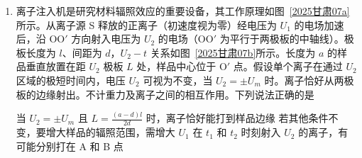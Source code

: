\documentclass[\gkver]{gaokaozhenti}
\begin{document}
\begin{enumerate}
{B．当 $t = \frac{T}{8}$ 与 $\frac{3T}{8}$ 时，因 $B-t$ 图像的斜率大小相等，符号相反，可知感应电动势 $E$ 大小相等，方向相反，选项 B 错误；

C．$t = \frac{T}{4}$ 时，$B$ 最大，则磁通量 $\Phi$ 最大，但是 $B$ 的变化率为零，则感应电动势 $E$ 为零，选项 C 正确；

D．$t = \frac{T}{2}$ 时，$B$ 为零，则磁通量 $\Phi$ 为零，但是 $B$ 的变化率最大，则感应电动势 $E$ 最大，选项 D 错误。

故选 C。
}

\item
离子注入机是研究材料辐照效应的重要设备，其工作原理如图~\ref{2025甘肃07a}所示。从离子源 S 释放的正离子（初速度视为零）经电压为 $U_{1}$ 的电场加速后，沿 OO$'$ 方向射入电压为 $U_{2}$ 的电场（OO$'$ 为平行于两极板的中轴线）。极板长度为 $l$、间距为 $d$，$U_{2}-t$ 关系如图~\ref{2025甘肃07b}所示。长度为 $a$ 的样品垂直放置在距 $U_{2}$ 极板 $L$ 处，样品中心位于 O$'$ 点。假设单个离子在通过 $U_{2}$ 区域的极短时间内，电压 $U_{2}$ 可视为不变，当 $U_{2} = \pm U_{m}$ 时。离子恰好从两极板的边缘射出。不计重力及离子之间的相互作用。下列说法正确的是


{当 $U_{2} = \pm U_{m}$ 且 $L = \frac{(a - d)l}{2d}$ 时，离子恰好能打到样品边缘}
{若其他条件不变，要增大样品的辐照范围，需增大 $U_{1}$}
{在 $t_{1}$ 和 $t_{2}$ 时刻射入 $U_{2}$ 的离子，有可能分别打在 A 和 B 点}

\end{enumerate}
\end{document}
